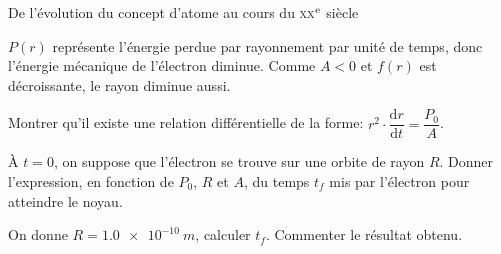 \begin{exo}[PC][1][devoir]{De l'évolution du concept d'atome au cours du \textsc{xx}$^{\rm e}$ siècle}
\begin{quest}
{$P(r)$ représente l'énergie perdue par rayonnement par unité de temps, donc l'énergie mécanique de l'électron diminue. Comme $A<0$ et $f(r)$ est décroissante, le rayon diminue aussi.
}

\item  Montrer qu'il existe une relation différentielle de la forme: $r^{2}\cdot\dfrac{\mathrm{d}r}{\mathrm{d}t}=\dfrac{P_{0}}{A}$.


\item  À $t=0$, on suppose que l'électron se trouve sur une orbite de
rayon $R$. Donner l'expression, en fonction de $P_{0}$, $R$ et
$A$, du temps $t_{f}$ mis par l'électron pour atteindre le noyau.


On donne $R=\SI{1,0e-10}{m}$, calculer $t_{f}$. Commenter le résultat
obtenu.


\end{quest}

\end{exo}



